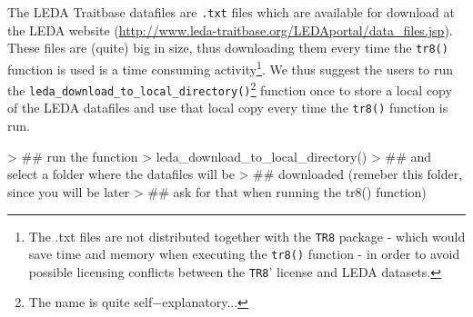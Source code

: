 \documentclass{article}
\begin{document}
  The LEDA Traitbase datafiles are \texttt{.txt} files which are
  available for download at the LEDA website
  (\url{http://www.leda-traitbase.org/LEDAportal/data_files.jsp}). These
  files are (quite) big in size, thus downloading them every time the
  \texttt{tr8()} function is used is a time consuming
  activity\footnote{The .txt files are not distributed together with the
    \texttt{TR8} package - which would save time and memory when executing
    the \texttt{tr8()} function - in order to avoid possible licensing
    conflicts between the \texttt{TR8}' license and LEDA datasets.}. We
  thus suggest the users to run the
  \texttt{leda\_download\_to\_local\_directory()}\footnote{The name is quite
    self$-$explanatory...} function once to store a local copy of the LEDA
  datafiles and use that local copy every time the \texttt{tr8()} function is run.
  
  
\begin{Schunk}
\begin{Sinput}
> ## run the function
> leda_download_to_local_directory()
> ## and select a folder where the datafiles will be
> ## downloaded (remeber this folder, since you will be later
> ## ask for that when running the tr8() function)
\end{Sinput}
\end{Schunk}

  

  


 

\end{document}
